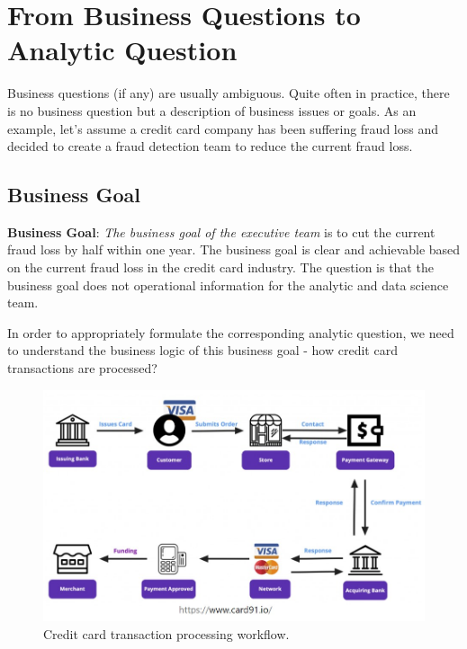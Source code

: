 \documentclass[
]{book}
\begin{document}
\hypertarget{from-business-questions-to-analytic-question}{%
\section{From Business Questions to Analytic Question}\label{from-business-questions-to-analytic-question}}

Business questions (if any) are usually ambiguous. Quite often in practice, there is no business question but a description of business issues or goals. As an example, let's assume a credit card company has been suffering fraud loss and decided to create a fraud detection team to reduce the current fraud loss.

\hypertarget{business-goal}{%
\subsection{Business Goal}\label{business-goal}}

\textbf{Business Goal}: \emph{The business goal of the executive team} is to cut the current fraud loss by half within one year. The business goal is clear and achievable based on the current fraud loss in the credit card industry. The question is that the business goal does not operational information for the analytic and data science team.

In order to appropriately formulate the corresponding analytic question, we need to understand the business logic of this business goal - how credit card transactions are processed?

\begin{figure}

{\centering \includegraphics[width=0.99\linewidth]{img01/w01-CreditCardProcessing} 

}

\caption{Credit card transaction processing workflow.}\label{fig:unnamed-chunk-7}
\end{figure}
\end{document}
